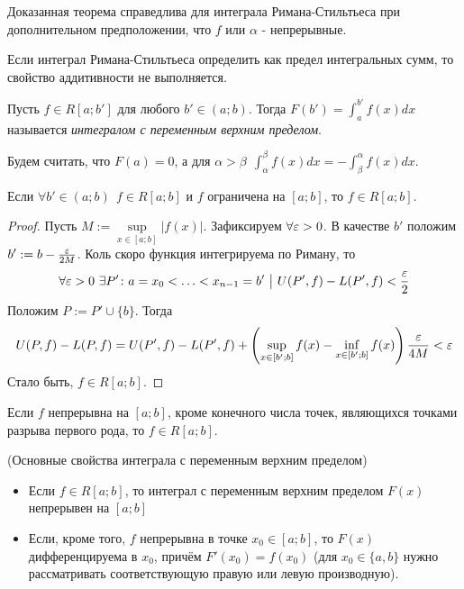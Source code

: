 \begin{note}
	Доказанная теорема справедлива для интеграла Римана-Стильтьеса при дополнительном предположении, что $f$ или $\alpha$ - непрерывные.
\end{note}

\begin{note}
	Если интеграл Римана-Стильтьеса определить как предел интегральных сумм, то свойство аддитивности не выполняется.
\end{note}

\begin{definition}
	Пусть $f \in R[a; b']$ для любого $b' \in (a; b)$. Тогда $F(b') = \int_a^{b'} f(x)dx$ называется \textit{интегралом с переменным верхним пределом}.
	
	Будем считать, что $F(a) = 0$, а для $\alpha > \beta\ \ \int_\alpha^\beta f(x)dx = -\int_\beta^\alpha f(x)dx$. 
\end{definition}

\begin{theorem}
	Если $\forall b' \in (a; b)\ \ f \in R[a; b]$ и $f$ ограничена на $[a; b]$, то $f \in R[a; b]$.
\end{theorem}

\begin{proof}
	Пусть $M := \sup\limits_{x \in [a; b]} |f(x)|$. Зафиксируем $\forall \varepsilon > 0$. В качестве $b'$ положим $b' := b - \frac{\varepsilon}{2M}$. Коль скоро функция интегрируема по Риману, то
	\[
		\forall \varepsilon > 0\ \exists P' \colon a = x_0 < \ldots < x_{n - 1} = b' \ \big|\  U(P', f) - L(P', f) < \frac{\varepsilon}{2}
	\]
	Положим $P := P' \cup \{b\}$. Тогда
	\[
		U(P, f) - L(P, f) = U(P', f) - L(P', f) + \left(\sup\limits_{x \in [b'; b]} f(x) - \inf\limits_{x \in [b'; b]} f(x)\right) \frac{\varepsilon}{4M} < \varepsilon
	\]
	Стало быть, $f \in R[a; b]$.
\end{proof}

\begin{corollary}
	Если $f$ непрерывна на $[a; b]$, кроме конечного числа точек, являющихся точками разрыва первого рода, то $f \in R[a; b]$.
\end{corollary}

\begin{theorem} (Основные свойства интеграла с переменным верхним пределом)
	\begin{itemize}
		\item Если $f \in R[a; b]$, то интеграл с переменным верхним пределом $F(x)$ непрерывен на $[a; b]$
		
		\item Если, кроме того, $f$ непрерывна в точке $x_0 \in [a; b]$, то $F(x)$ дифференцируема в $x_0$, причём $F'(x_0) = f(x_0)$ (для $x_0 \in \{a, b\}$ нужно рассматривать соответствующую правую или левую производную).
	\end{itemize}
\end{theorem}

